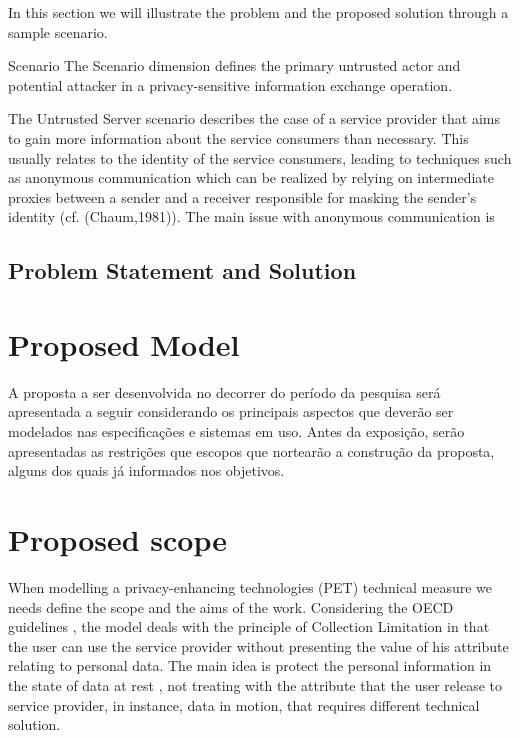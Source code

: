 \documentclass{doublecol-new}
\begin{document}
In this section we will illustrate the problem and the proposed solution through a sample scenario.

Scenario The Scenario dimension defines the primary untrusted actor and potential attacker in a privacy-sensitive information exchange operation.

The Untrusted Server scenario describes the case of a service provider that aims to gain more information about the service
consumers than necessary. This usually relates to the identity of the service consumers, leading to techniques such as
anonymous communication which can be realized by relying on intermediate proxies between a sender and a receiver
responsible for masking the sender's identity (cf. (Chaum,1981)). The main issue with anonymous communication is




\subsection[sec:problemstatement]{Problem Statement and Solution}




\section{Proposed Model}
A proposta a ser desenvolvida no decorrer do período da pesquisa será apresentada a seguir considerando os principais aspectos que deverão ser modelados nas especificações e sistemas em uso. Antes da exposição, serão apresentadas as restrições que escopos que nortearão a construção da proposta, alguns dos quais já informados nos objetivos.



\section{Proposed scope}

When modelling a privacy-enhancing technologies (PET) technical measure we needs define the scope and the aims of the work. Considering the OECD guidelines \citep{oecd2013guidelinesupdated}, the model deals with the principle of Collection Limitation in that the user can use the service provider without presenting the value of his attribute relating to personal data. The main idea is protect the personal information in the state of data at rest \citep{liu2010data}, not treating with the attribute that the user release to service provider, in instance, data in motion, that requires different technical solution. 
\end{document}
